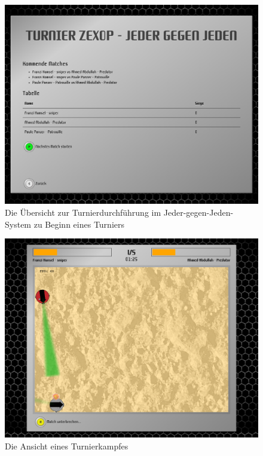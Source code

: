 \begin{figure}
  \centering
  \label{tournament-execution-start}
  \includegraphics[width=15cm, keepaspectratio]{figures/11-turnierdurchfuehrung-start.png}
  \caption{Die Übersicht zur Turnierdurchführung im Jeder-gegen-Jeden-System zu Beginn eines Turniers}
\end{figure}

\begin{figure}
  \centering
  \label{tournament-execution-match}
  \includegraphics[width=15cm, keepaspectratio]{figures/14-turnierdurchfuehrung-kampf.png}
  \caption{Die Ansicht eines Turnierkampfes}
\end{figure}

